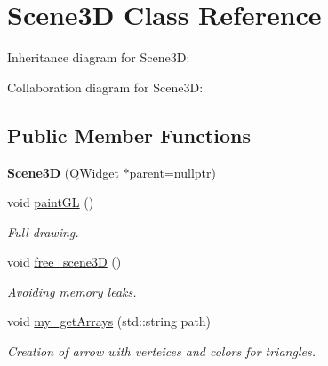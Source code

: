 \hypertarget{class_scene3_d}{}\section{Scene3D Class Reference}
\label{class_scene3_d}


Inheritance diagram for Scene3D\+:


Collaboration diagram for Scene3D\+:
\subsection*{Public Member Functions}
\begin{DoxyCompactItemize}
\item 
\mbox{\label{class_scene3_d_ac8e10fe0b55a8f6330d5407d48031ce2}} 
{\bfseries Scene3D} (Q\+Widget $\ast$parent=nullptr)
\item 
\mbox{\label{class_scene3_d_a0f20c3664166ef70328f2b671509495f}} 
void \hyperlink{class_scene3_d_a0f20c3664166ef70328f2b671509495f}{paint\+GL} ()
\begin{DoxyCompactList}\small\item\em Full drawing. \end{DoxyCompactList}\item 
void \hyperlink{class_scene3_d_a5e71ee5b49ecd2e7cf520ada9117c07a}{free\+\_\+scene3D} ()
\begin{DoxyCompactList}\small\item\em Avoiding memory leaks. \end{DoxyCompactList}\item 
void \hyperlink{class_scene3_d_a06303e7fef9f24731a798a5559329e8b}{my\+\_\+get\+Arrays} (std\+::string path)
\begin{DoxyCompactList}\small\item\em Creation of arrow with verteices and colors for triangles. \end{DoxyCompactList}\end{DoxyCompactItemize}
